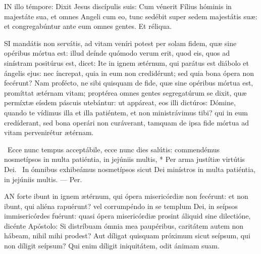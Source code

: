 




\lettrine[lines=2]{I}{N} illo témpore: Dixit Jesus discípulis suis: Cum vénerit Fílius hóminis in majestáte sua, et omnes Angeli cum eo, tunc sedébit super sedem majestátis suæ: et congregabúntur ante eum omnes gentes. Et réliqua.



\lettrine[lines=2]{S}{I} mandátis non servátis, ad vitam veníri potest per solam fidem, quæ sine opéribus mórtua est: illud deínde quómodo verum erit, quod eis, quos ad sinístram positúrus est, dicet: Ite in ignem ætérnum, qui parátus est diábolo et ángelis ejus: nec íncrepat, quia in eum non credidérunt; sed quia bona ópera non fecérunt? Nam profécto, ne sibi quisquam de fide, quæ sine opéribus mórtua est, promíttat ætérnam vitam; proptérea omnes gentes segregatúrum se dixit, quæ permíxtæ eísdem páscuis utebántur: ut appáreat, eos illi dictúros: Dómine, quando te vídimus illa et illa patiéntem, et non ministrávimus tibi? qui in eum credíderant, sed bona operári non curáverant, tamquam de ipsa fide mórtua ad vitam pervenirétur ætérnam.

\R\ Ecce nunc tempus acceptábile, ecce nunc dies salútis: commendémus nosmetípsos in multa patiéntia, in jejúniis multis, * Per arma justítiæ virtútis Dei. \V\ In ómnibus exhibeámus nosmetípsos sicut Dei minístros in multa patiéntia, in jejúniis multis. --- Per.


\lettrine[lines=2]{A}{N} forte ibunt in ignem ætérnum, qui ópera misericórdiæ non fecérunt: et non ibunt, qui aliéna rapuérunt? vel corrumpéndo in se templum Dei, in seípsos immisericórdes fuérunt: quasi ópera misericórdiæ prosint áliquid sine dilectióne, dicénte Apóstolo: Si distríbuam ómnia mea paupéribus, caritátem autem non hábeam, nihil mihi prodest? Aut díligat quisquam próximum sicut seípsum, qui non díligit seípsum? Qui enim díligit iniquitátem, odit ánimam suam.

